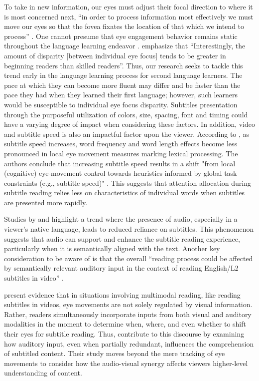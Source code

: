To take in new information, our eyes must adjust their focal direction
to where it is most concerned next, ``in order to process information
most effectively we must move our eyes so that the fovea fixates the
location of that which we intend to process'' \cite[p. 84]{schotter2012}. One cannot presume that eye engagement behavior remains
static throughout the language learning endeavor \cite{blythe2005}.
\textcite[p. 86]{schotter2012} emphasize that ``Interestingly, the
amount of disparity {[}between individual eye focus{]} tends to be
greater in beginning readers than skilled readers''. Thus, our research
seeks to tackle this trend early in the language learning process for
second language learners. The pace at which they can become more fluent
may differ and be faster than the pace they had when they learned their
first language; however, such learners would be susceptible to
individual eye focus disparity. Subtitles presentation through the
purposeful utilization of colors, size, spacing, font and timing could
have a varying degree of impact when considering these factors. In
addition, video and subtitle speed is also an impactful factor upon the
viewer. According to \textcite{liao2020}, as subtitle speed increases,
word frequency and word length effects become less pronounced in local
eye movement measures marking lexical processing. The authors conclude
that increasing subtitle speed results in a shift "from local
(cognitive) eye-movement control towards heuristics informed by global
task constraints (e.g., subtitle speed)" \textcite[p. 430]{liao2020}.
This suggests that attention allocation during subtitle reading relies
less on characteristics of individual words when subtitles are presented
more rapidly.

Studies by \textcite{ross2023} and \textcite{szarkowska2018}
highlight a trend where the presence of audio, especially in a viewer's
native language, leads to reduced reliance on subtitles. This phenomenon
suggests that audio can support and enhance the subtitle reading
experience, particularly when it is semantically aligned with the text.
Another key consideration to be aware of is that the overall ``reading
process could be affected by semantically relevant auditory input in the
context of reading English/L2 subtitles in video'' \cite[p. 259]{liao2020}.

\textcite{liao2022} present evidence that in situations involving
multimodal reading, like reading subtitles in videos, eye movements are
not solely regulated by visual information. Rather, readers
simultaneously incorporate inputs from both visual and auditory
modalities in the moment to determine when, where, and even whether to
shift their eyes for subtitle reading. Thus, \textcite{liao2022}
contribute to this discourse by examining how auditory input, even when
partially redundant, influences the comprehension of subtitled content.
Their study moves beyond the mere tracking of eye movements to consider
how the audio-visual synergy affects viewers\textquotesingle{}
higher-level understanding of content.

